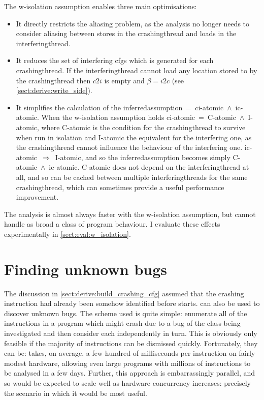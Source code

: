 {The \gls{w-isolation} assumption enables three main optimisations:

\begin{itemize}
\item
  It directly restricts the aliasing problem, as the analysis no
  longer needs to consider aliasing between stores in the
  \gls{crashingthread} and loads in the \gls{interferingthread}.
\item
  It reduces the set of interfering \glspl{cfg} which is generated for
  each \gls{crashingthread}.  If the \gls{interferingthread} cannot
  load any location stored to by the \gls{crashingthread} then $c2i$
  is empty and $\beta = i2c$ (see \autoref{sect:derive:write_side}).
\item
  It simplifies the calculation of the
  \gls{inferredassumption}~=~\gls{ci-atomic}~$\wedge$~\gls{ic-atomic}.
  When the \gls{w-isolation} assumption holds
  \gls{ci-atomic}~=~C-atomic~$\wedge$~I-atomic, where C-atomic is the
  condition for the \gls{crashingthread} to survive when run in
  isolation and I-atomic the equivalent for the interfering one, as
  the \gls{crashingthread} cannot influence the behaviour of the
  interfering one.  \gls{ic-atomic}~$\Rightarrow$~I-atomic, and so the
  \gls{inferredassumption} becomes simply
  C-atomic~$\wedge$~\gls{ic-atomic}.  C-atomic does not depend on the
  \gls{interferingthread} at all, and so can be cached between
  multiple \glspl{interferingthread} for the same
  \gls{crashingthread}, which can sometimes provide a useful
  performance improvement.
\end{itemize}

The analysis is almost always faster with the \gls{w-isolation}
assumption, but cannot handle as broad a class of program behaviour.
I evaluate these effects experimentally in
\autoref{sect:eval:w_isolation}.

\section{Finding unknown bugs}
\label{sect:derive:unknown_bugs}

The discussion in \autoref{sect:derive:build_crashing_cfg} assumed
that the crashing instruction had already been somehow identified
before {\technique} starts.  {\Technique} can also be used to discover
unknown bugs.  The scheme used is quite simple: enumerate all of the
instructions in a program which might crash due to a bug of the class
being investigated and then consider each independently in turn.  This
is obviously only feasible if the majority of instructions can be
dismissed quickly.  Fortunately, they can be: {\implementation} takes,
on average, a few hundred of milliseconds per instruction on fairly
modest hardware, allowing even large programs with millions of
instructions to be analysed in a few days.  Further, this approach is
embarrassingly parallel, and so would be expected to scale well as
hardware concurrency increases: precisely the scenario in which it
would be most useful.

}
